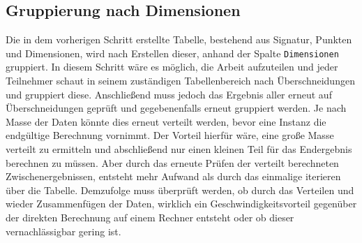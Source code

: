 \subsection{Gruppierung nach Dimensionen}

Die in dem vorherigen Schritt erstellte Tabelle, bestehend aus Signatur, Punkten und Dimensionen, wird nach Erstellen dieser, anhand der Spalte \verb|Dimensionen| gruppiert. In diesem Schritt wäre es möglich, die Arbeit aufzuteilen und jeder Teilnehmer schaut in seinem zuständigen Tabellenbereich nach Überschneidungen und gruppiert diese. Anschließend muss jedoch das Ergebnis aller erneut auf Überschneidungen geprüft und gegebenenfalls erneut gruppiert werden. Je nach Masse der Daten könnte dies erneut verteilt werden, bevor eine Instanz die endgültige Berechnung vornimmt. Der Vorteil hierfür wäre, eine große Masse verteilt zu ermitteln und abschließend nur einen kleinen Teil für das Endergebnis berechnen zu müssen. Aber durch das erneute Prüfen der verteilt berechneten Zwischenergebnissen, entsteht mehr Aufwand als durch das einmalige iterieren über die Tabelle. Demzufolge muss überprüft werden, ob durch das Verteilen und wieder Zusammenfügen der Daten, wirklich ein Geschwindigkeitsvorteil gegenüber der direkten Berechnung auf einem Rechner entsteht oder ob dieser vernachlässigbar gering ist.

